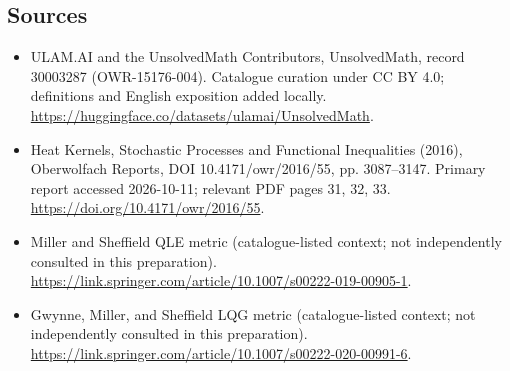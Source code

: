 \documentclass[11pt]{article}
\begin{document}
\subsection{Sources}
\begin{itemize}
\item[\hypertarget{source:30003287:1}{S1}] ULAM.AI and the UnsolvedMath Contributors, UnsolvedMath, record 30003287 (OWR-15176-004). Catalogue curation under CC BY 4.0; definitions and English exposition added locally.
\url{https://huggingface.co/datasets/ulamai/UnsolvedMath}.
\item[\hypertarget{source:30003287:2}{S2}] Heat Kernels, Stochastic Processes and Functional Inequalities (2016), Oberwolfach Reports, DOI 10.4171/owr/2016/55, pp. 3087--3147. Primary report accessed 2026-10-11; relevant PDF pages 31, 32, 33.
\url{https://doi.org/10.4171/owr/2016/55}.
\item[\hypertarget{source:30003287:3}{S3}] Miller and Sheffield QLE metric (catalogue-listed context; not independently consulted in this preparation).
\url{https://link.springer.com/article/10.1007/s00222-019-00905-1}.
\item[\hypertarget{source:30003287:4}{S4}] Gwynne, Miller, and Sheffield LQG metric (catalogue-listed context; not independently consulted in this preparation).
\url{https://link.springer.com/article/10.1007/s00222-020-00991-6}.
\end{itemize}
\label{end:30003287}
\end{document}
